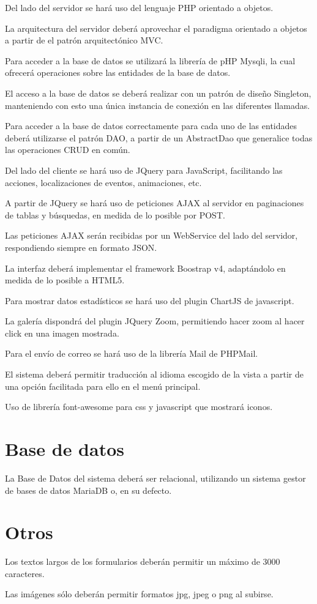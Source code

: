 Del lado del servidor se har\'{a} uso del lenguaje PHP orientado a objetos.

La arquitectura del servidor deber\'{a} aprovechar el paradigma orientado a objetos a partir de el patr\'{o}n arquitect\'{o}nico MVC.

Para acceder a la base de datos se utilizar\'{a} la librer\'{i}a de pHP Mysqli, la cual ofrecer\'{a} operaciones sobre las entidades de la base de datos.

El acceso a la base de datos se deber\'{a} realizar con un patr\'{o}n de dise\~{n}o Singleton, manteniendo con esto una \'{u}nica instancia de conexi\'{o}n en las diferentes llamadas.

Para acceder a la base de datos correctamente para cada uno de las entidades deber\'{a} utilizarse el patr\'{o}n DAO, a partir de un AbstractDao que generalice todas las operaciones CRUD en com\'{u}n.

Del lado del cliente se har\'{a} uso de JQuery para JavaScript, facilitando las acciones, localizaciones de eventos, animaciones, etc.

A partir de JQuery se har\'{a} uso de peticiones AJAX al servidor en paginaciones de tablas y b\'{u}squedas, en medida de lo posible por POST.

Las peticiones AJAX ser\'{a}n recibidas por un WebService del lado del servidor, respondiendo siempre en formato JSON.

La interfaz deber\'{a} implementar el framework Boostrap v4, adapt\'{a}ndolo en medida de lo posible a HTML5.

Para mostrar datos estad\'{i}sticos se har\'{a} uso del plugin ChartJS de javascript.

La galer\'{i}a dispondr\'{a} del plugin JQuery Zoom, permitiendo hacer zoom al hacer click en una imagen mostrada.

Para el env\'{i}o de correo se har\'{a} uso de la librer\'{i}a Mail de PHPMail.

El sistema deber\'{a} permitir traducci\'{o}n al idioma escogido de la vista a partir de una opci\'{o}n facilitada para ello en el men\'{u} principal.

Uso de librer\'{i}a font-awesome para css y javascript que mostrar\'{a} iconos.


\section{Base de datos}

La Base de Datos del sistema deber\'{a} ser relacional, utilizando un sistema gestor de bases de datos MariaDB o, en su defecto.


\section{Otros}

Los textos largos de los formularios deber\'{a}n permitir un m\'{a}ximo de 3000 caracteres.

Las im\'{a}genes s\'{o}lo deber\'{a}n permitir formatos jpg, jpeg o png al subirse.

